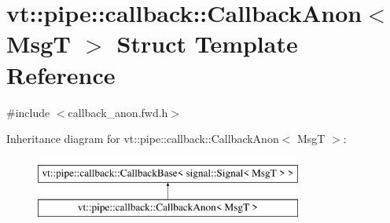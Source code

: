 \hypertarget{structvt_1_1pipe_1_1callback_1_1_callback_anon}{}\section{vt\+:\+:pipe\+:\+:callback\+:\+:Callback\+Anon$<$ MsgT $>$ Struct Template Reference}
\label{structvt_1_1pipe_1_1callback_1_1_callback_anon}


{\ttfamily \#include $<$callback\+\_\+anon.\+fwd.\+h$>$}

Inheritance diagram for vt\+:\+:pipe\+:\+:callback\+:\+:Callback\+Anon$<$ MsgT $>$\+:\begin{figure}[H]
\begin{center}
\leavevmode
\includegraphics[height=2.000000cm]{structvt_1_1pipe_1_1callback_1_1_callback_anon}
\end{center}
\end{figure}
